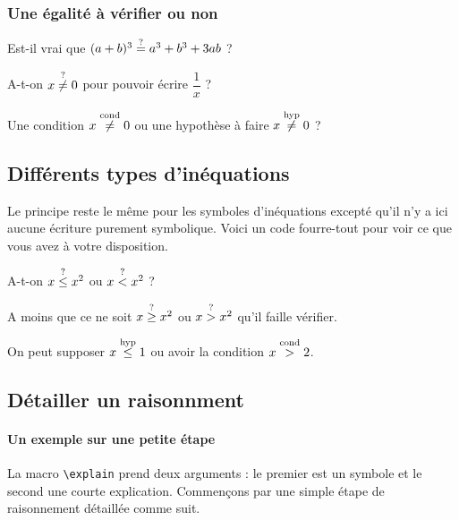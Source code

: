 \documentclass[12pt,a4paper]{article}
\theoremstyle{definition}
\begin{document}
        \subsubsection{Une égalité à vérifier ou non}

\begin{tcblisting}{}
Est-il vrai que $(a + b)^3 \eqtest a^3 + b^3 + 3 a b$ ?

A-t-on $x \neqtest 0$ pour pouvoir écrire $\dfrac{1}{x}$ ?

Une condition $x \neqcond 0$ ou une hypothèse à faire $x \neqhyp 0$ ?

\end{tcblisting}



    \subsection{Différents types d'inéquations}
    
Le principe reste le même pour les symboles d'inéquations excepté qu'il n'y a ici aucune écriture purement symbolique. Voici un code \og fourre-tout \fg{} pour voir ce que vous avez à votre disposition.

\begin{tcblisting}{}
A-t-on $x \leqtest x^2$ ou $x \ltest x^2$ ?

A moins que ce ne soit $x \geqtest x^2$ ou $x \gtest x^2$ qu'il faille vérifier.

On peut supposer $x \leqhyp 1$ ou avoir la condition $x \gcond 2$.

\end{tcblisting}




    \subsection{Détailler un raisonnment}
    
	    \paragraph{Un exemple sur une petite étape}
    
La macro \verb+\explain+ prend deux arguments : le premier est un symbole et le second une courte explication. Commençons par une simple étape de raisonnement détaillée comme suit.
\end{document}
